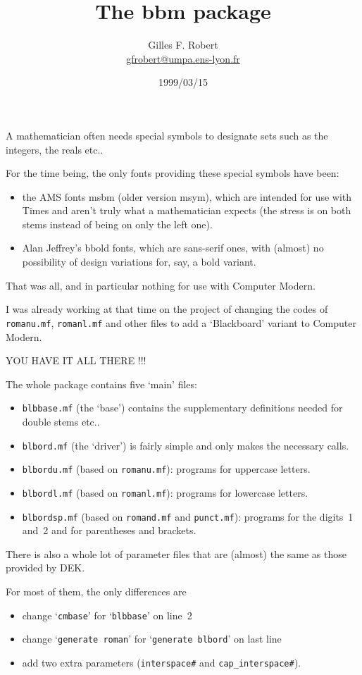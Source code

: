 \documentclass[DIV=9, pagesize=auto]{scrartcl}
\title{The \textsf{bbm} package}
\author{Gilles F. Robert \\ \href{mailto:gfrobert@umpa.ens-lyon.fr}{gfrobert@umpa.ens-lyon.fr}}
\date{1999/03/15}
\begin{document}
\maketitle

\noindent
A mathematician often needs special symbols to designate sets such as the
integers, the reals etc..

For the time being, the only fonts providing these special symbols have been:
%
\begin{itemize}
\item the AMS fonts \textsf{msbm} (older version \textsf{msym}), which are intended for use with
  Times and aren't truly what a mathematician expects (the stress is on both
  stems instead of being on only the left one).
\item Alan Jeffrey's \textsf{bbold} fonts, which are sans-serif ones, with (almost) no
  possibility of design variations for, say, a bold variant.
\end{itemize}
%
That was all, and in particular nothing for use with Computer Modern.

I was already working at that time on the project of changing the codes of
\texttt{romanu.mf}, \texttt{romanl.mf} and other files to add a `Blackboard' variant to
Computer Modern.

\begin{center}
  YOU HAVE IT ALL THERE !!!  
\end{center}
%
The whole package contains five `main' files:
%
\begin{itemize}
\item \texttt{blbbase.mf} (the `base') contains the supplementary definitions needed
  for double stems etc..
\item \texttt{blbord.mf} (the `driver') is fairly simple and only makes the necessary
  calls.
\item \texttt{blbordu.mf} (based on \texttt{romanu.mf}): programs for uppercase letters.
\item \texttt{blbordl.mf} (based on \texttt{romanl.mf}): programs for lowercase letters.
\item \texttt{blbordsp.mf} (based on \texttt{romand.mf} and \texttt{punct.mf}): programs for the digits~1
and~2 and for parentheses and brackets.
\end{itemize}
%
There is also a whole lot of parameter files that are (almost) the same as
those provided by DEK.

For most of them, the only differences are
%
\begin{itemize}
\item change `\verb+cmbase+' for `\verb+blbbase+' on line~2
\item change `\verb+generate roman+' for `\verb+generate blbord+' on last line
\item add two extra parameters (\verb+interspace#+ and \verb+cap_interspace#+).
\end{itemize}
\end{document}
